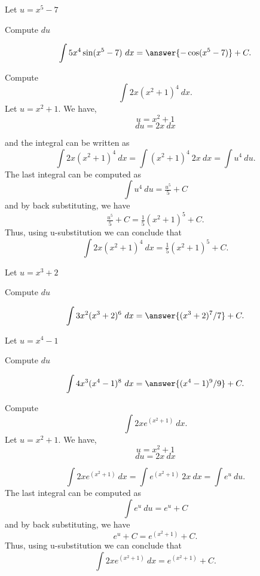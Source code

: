 \documentclass{ximera}
\begin{document}
\begin{problem}
\begin{hint}
Let $u = x^5 -7$
\end{hint}
\begin{hint}
Compute $du$
\end{hint}
\[\int 5x^4\sin(x^5 -7) \ dx = \answer{-\cos(x^5 -7)} +C.\]
\end{problem}


\begin{example} Compute 
\[\int 2x(x^2 + 1)^4 \ dx.\]
Let $u = x^2 + 1$.  We have,
\[u = x^2 + 1\]
\[du = 2x \ dx\]

and the integral can be written as 
\[\int 2x(x^2 + 1)^4 \ dx = \int (x^2 + 1)^4 \ 2x \  dx = \int u^4 \ du.\]
The last integral can be computed as 
\[\int u^4 \ du = \tfrac{u^5}{5} + C\]
and by back substituting, we have 
\[\tfrac{u^5}{5} + C = \tfrac15(x^2 + 1)^5 + C .\]
Thus, using u-substitution we can conclude that
\[\int 2x(x^2 + 1)^4 \ dx  =  \tfrac15(x^2 + 1)^5 + C .\]
\end{example}

\begin{problem}
\begin{hint}
Let $u = x^3 + 2$
\end{hint}
\begin{hint}
Compute $du$
\end{hint}
\[\int 3x^2(x^3 + 2)^6 \ dx = \answer{(x^3 + 2)^7/7} +C.\]
\end{problem}

\begin{problem}
\begin{hint}
Let $u = x^4 -1$
\end{hint}
\begin{hint}
Compute $du$
\end{hint}
\[\int 4x^3(x^4 -1)^8 \ dx = \answer{(x^4 -1)^9/9} +C.\]
\end{problem}

\begin{example} Compute 
\[\int 2xe^{(x^2 + 1)} \ dx.\]
Let $u = x^2 + 1$.  We have,
\[u = x^2 + 1\]
\[du = 2x \ dx\]

\[\int 2xe^{(x^2 + 1)} \ dx = \int e^{(x^2 + 1)} \ 2x\  dx = \int e^u \ du.\]
The last integral can be computed as 
\[\int e^u \ du = e^u + C\]
and by back substituting, we have 
\[e^u + C = e^{(x^2 + 1)} + C.\]
Thus, using u-substitution we can conclude that
\[\int 2xe^{(x^2 + 1)} \ dx =  e^{(x^2 + 1)} + C.\]
\end{example}
\end{document}
